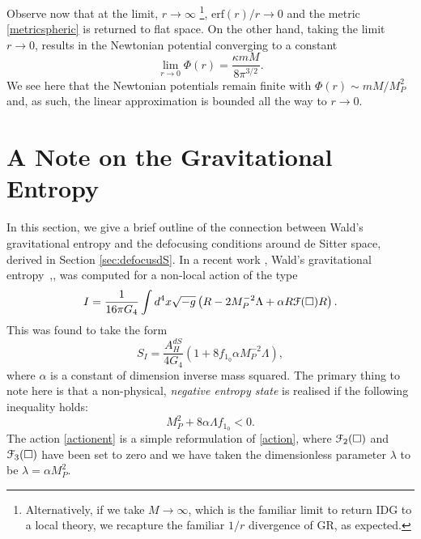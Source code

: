  Observe now that at the limit, $r\rightarrow \infty$ \footnote{Alternatively, if we take $M\rightarrow\infty$, which is the familiar limit to return IDG to a local theory, we recapture the familiar $1/r$ divergence of GR, as expected.}, $\mbox{erf}(r)/r\rightarrow 0$ and the metric \eqref{metricspheric} is returned to flat space. On the other hand, taking the limit $r\rightarrow 0$, results in the Newtonian potential converging to a constant
 \[
 \lim_{r\rightarrow 0} \Phi(r)=\frac{\kappa m M}{8\pi^{3/2}}
 .\]
 We see here that the Newtonian potentials remain finite with $\Phi(r)\sim m M/M_P^2$ and, as such, the linear approximation is bounded all the way to $r\rightarrow 0$.

\chapter{A Note on the Gravitational Entropy}
\label{sec:Entropy}
In this section, we give a brief outline of the connection between Wald's gravitational entropy and the defocusing conditions around de Sitter space, derived in Section \ref{sec:defocusdS}. In a recent work \cite{Conroy:2015nva}, Wald's gravitational entropy~\cite{Wald:1993nt},\cite{Myers}, was computed for a non-local action of the type
\[
\label{actionent}
I=\frac{1}{16\pi G_{4}}\int d^{4}x\sqrt{-g}\left(R-2M_{P}^{-2}\Lambda+\alpha R{\cal F}(\Box)R\right)
. \] 
This was found to take the form
 \[
 \label{dsent}
 S_{I}=\frac{A_{H}^{dS}}{4G_{4}}\left(1+8f_{1_0}\alpha M_{P}^{-2}\Lambda\right)
 ,\]
 where $\alpha$ is a constant of dimension inverse mass squared. The primary thing to note here is that a non-physical, \emph{negative entropy state} is realised if the following inequality holds:
 \[
 \label{negent}
M_{P}^{2}+8\alpha\Lambda f_{1_{0}}<0.
   \]
The action \eqref{actionent} is a simple reformulation of \eqref{action}, where ${\cal F}_2(\Box)$ and ${\cal F}_3(\Box)$ have been set to zero and we have taken the dimensionless parameter $\lambda$ to be $\lambda=\alpha M_{P}^{2}$. 

